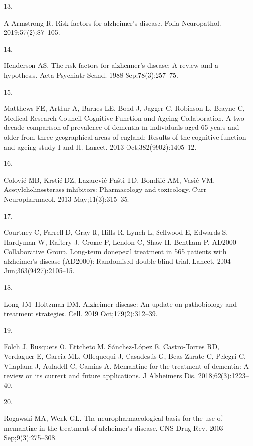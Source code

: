 \documentclass[
  a4paper,
]{article}
\newlength{\cslhangindent}
\newlength{\csllabelwidth}
\newlength{\cslentryspacingunit} %
\newenvironment{CSLReferences}[2] %
 {%
  \setlength{\parindent}{0pt}
  \ifodd #1
  \let\oldpar\par
  \def\par{\hangindent=\cslhangindent\oldpar}
  \fi
  \setlength{\parskip}{#2\cslentryspacingunit}
 }%
 {}
\newcommand{\CSLLeftMargin}[1]{\parbox[t]{\csllabelwidth}{#1}}
\newcommand{\CSLRightInline}[1]{\parbox[t]{\linewidth - \csllabelwidth}{#1}\break}
\begin{document}
\begin{CSLReferences}{0}{0}
\leavevmode{}%
\CSLLeftMargin{13. }%
\CSLRightInline{A Armstrong R. Risk factors for alzheimer's disease.
Folia Neuropathol. 2019;57(2):87--105. }

\leavevmode{}%
\CSLLeftMargin{14. }%
\CSLRightInline{Henderson AS. The risk factors for alzheimer's disease:
A review and a hypothesis. Acta Psychiatr Scand. 1988 Sep;78(3):257--75.
}

\leavevmode{}%
\CSLLeftMargin{15. }%
\CSLRightInline{Matthews FE, Arthur A, Barnes LE, Bond J, Jagger C,
Robinson L, Brayne C, Medical Research Council Cognitive Function and
Ageing Collaboration. A two-decade comparison of prevalence of dementia
in individuals aged 65 years and older from three geographical areas of
england: Results of the cognitive function and ageing study {I} and
{II}. Lancet. 2013 Oct;382(9902):1405--12. }

\leavevmode{}%
\CSLLeftMargin{16. }%
\CSLRightInline{Colović MB, Krstić DZ, Lazarević-Pašti TD, Bondžić AM,
Vasić VM. Acetylcholinesterase inhibitors: Pharmacology and toxicology.
Curr Neuropharmacol. 2013 May;11(3):315--35. }

\leavevmode{}%
\CSLLeftMargin{17. }%
\CSLRightInline{Courtney C, Farrell D, Gray R, Hills R, Lynch L,
Sellwood E, Edwards S, Hardyman W, Raftery J, Crome P, Lendon C, Shaw H,
Bentham P, AD2000 Collaborative Group. Long-term donepezil treatment in
565 patients with alzheimer's disease ({AD2000)}: Randomised
double-blind trial. Lancet. 2004 Jun;363(9427):2105--15. }

\leavevmode{}%
\CSLLeftMargin{18. }%
\CSLRightInline{Long JM, Holtzman DM. Alzheimer disease: An update on
pathobiology and treatment strategies. Cell. 2019 Oct;179(2):312--39. }

\leavevmode{}%
\CSLLeftMargin{19. }%
\CSLRightInline{Folch J, Busquets O, Ettcheto M, Sánchez-López E,
Castro-Torres RD, Verdaguer E, Garcia ML, Olloquequi J, Casadesús G,
Beas-Zarate C, Pelegri C, Vilaplana J, Auladell C, Camins A. Memantine
for the treatment of dementia: A review on its current and future
applications. J Alzheimers Dis. 2018;62(3):1223--40. }

\leavevmode{}%
\CSLLeftMargin{20. }%
\CSLRightInline{Rogawski MA, Wenk GL. The neuropharmacological basis for
the use of memantine in the treatment of alzheimer's disease. CNS Drug
Rev. 2003 Sep;9(3):275--308. }


\end{CSLReferences}
\end{document}
